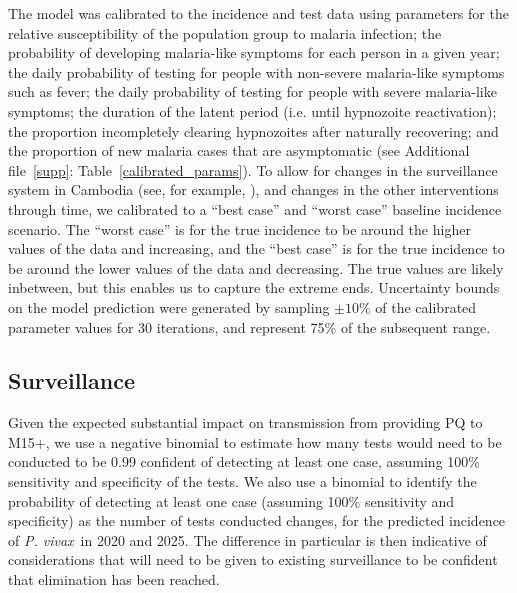 \documentclass[doublespacing]{bmcart}
\newcommand{\pv}{\textit{P. vivax}}
\begin{document}
The model was calibrated to the incidence and test data using parameters for the relative susceptibility of the population group to malaria infection; the probability of developing malaria-like symptoms for each person in a given year; the daily probability of testing for people with non-severe malaria-like symptoms such as fever; the daily probability of testing for people with severe malaria-like symptoms; the duration of the latent period (i.e. until hypnozoite reactivation); the proportion incompletely clearing hypnozoites after naturally recovering; and the proportion of new malaria cases that are asymptomatic (see Additional file~\ref{supp}: Table~\ref{calibrated_params}). To allow for changes in the surveillance system in Cambodia (see, for example, \cite{Pengby}), and changes in the other interventions through time, we calibrated to a ``best case'' and ``worst case'' baseline incidence scenario. The ``worst case'' is for the true incidence to be around the higher values of the data and increasing, and the ``best case'' is for the true incidence to be around the lower values of the data and decreasing. The true values are likely inbetween, but this enables us to capture the extreme ends. Uncertainty bounds on the model prediction were generated by sampling $\pm10\%$ of the calibrated parameter values for 30 iterations, and represent 75\% of the subsequent range.

 


\subsection*{Surveillance}
Given the expected substantial impact on transmission from providing PQ to M15+, we use a negative binomial to estimate how many tests would need to be conducted to be 0.99 confident of detecting at least one case, assuming 100\% sensitivity and specificity of the tests. We also use a binomial to identify the probability of detecting at least one case (assuming 100\% sensitivity and specificity) as the number of tests conducted changes, for the predicted incidence of \pv~in 2020 and 2025. The difference in particular is then indicative of considerations that will need to be given to existing surveillance to be confident that elimination has been reached.
\end{document}
